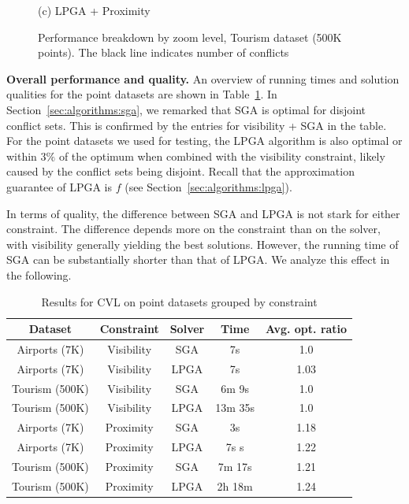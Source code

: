 \documentclass[11pt, oneside]{report}
\newcommand{\minisec}[1]{\noindent\textbf{#1.}}
\begin{document}
{\begin{figure}[tb]
\begin{minipage}{0.329\linewidth}
    \centerline{(c) LPGA + Proximity}
  \end{minipage}
  \caption{Performance breakdown by zoom level, Tourism dataset (500K points). The black line indicates number of conflicts} \label{fig:performance:tourism}
\vspace{-1ex}
\end{figure}

\minisec{Overall performance and quality}
An overview of running times and solution qualities for the point datasets are shown in Table~\ref{tab:points:overview}. In Section~\ref{sec:algorithms:sga}, we remarked that SGA is optimal for disjoint conflict sets. This is confirmed by the entries for visibility + SGA in the table. For the point datasets we used for testing, the LPGA algorithm is also optimal or within $3\%$ of the optimum when combined with the visibility constraint, likely caused by the conflict sets being disjoint. Recall that the approximation guarantee of LPGA is $f$ (see Section~\ref{sec:algorithms:lpga}).

In terms of quality, the difference between SGA and LPGA is not stark for either constraint. The difference depends more on the constraint than on the solver, with visibility generally yielding the best solutions. However, the running time of SGA can be substantially shorter than that of LPGA. We analyze this effect in the following.

\begin{table}[htdp]
\caption{Results for CVL on point datasets grouped by constraint}
\begin{center}
\begin{tabular}{|c|c|c|c|c|}
\hline
\textbf{Dataset} & \textbf{Constraint} & \textbf{Solver} & \textbf{Time} & \textbf{Avg. opt. ratio}\\ 
\hline
Airports (7K) & Visibility & SGA & 7s & 1.0 \\
Airports (7K) & Visibility & LPGA & 7s & 1.03 \\
Tourism (500K) & Visibility & SGA & 6m 9s & 1.0 \\
Tourism (500K) & Visibility & LPGA & 13m 35s & 1.0 \\
\hline
Airports (7K)  & Proximity  & SGA & 3s & 1.18 \\
Airports (7K)  & Proximity & LPGA & 7s s & 1.22 \\
Tourism (500K) & Proximity & SGA & 7m 17s & 1.21 \\
Tourism (500K) & Proximity & LPGA & 2h 18m & 1.24 \\
\hline
\end{tabular}
\end{center}
\label{tab:points:overview}
\end{table}%

}
\end{document}
